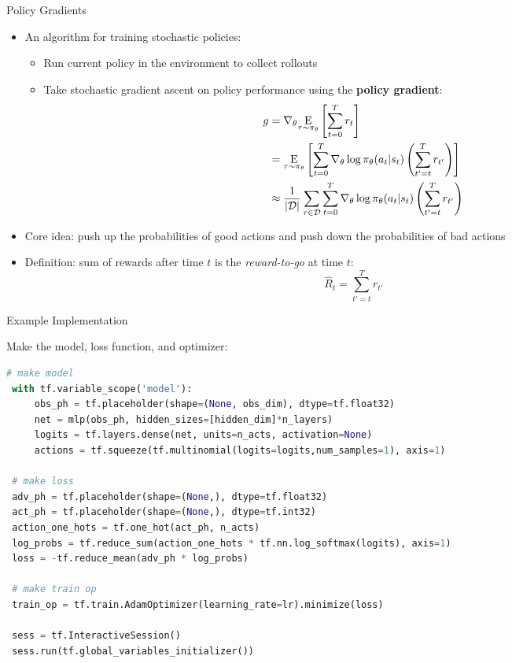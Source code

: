 \documentclass[9pt]{beamer}
\newcommand{\underE}[2]{\underset{\begin{subarray}{c}#1 \end{subarray}}{\E}\left[ #2 \right]}
\begin{document}
\begin{frame}{Policy Gradients}


\begin{itemize}
\item An algorithm for training stochastic policies:
\begin{itemize}
\item Run current policy in the environment to collect rollouts
\item Take stochastic gradient ascent on policy performance using the \textbf{policy gradient}:
\begin{align*}
g &= \nabla_{\theta} \underE{\tau \sim \pi_{\theta}}{\sum_{t=0}^T r_t} \\
&= \underE{\tau \sim \pi_{\theta}}{\sum_{t=0}^T \nabla_{\theta} \log \pi_{\theta}(a_t | s_t) \left(\sum_{t'=t}^T r_{t'}\right)}\\
&\approx \frac{1}{|\calD|}\sum_{\tau \in \calD} \sum_{t=0}^T \nabla_{\theta} \log \pi_{\theta}(a_t | s_t) \left(\sum_{t'=t}^T r_{t'}\right)
\end{align*}
\end{itemize}
\item Core idea: push up the probabilities of good actions and push down the probabilities of bad actions
\item Definition: sum of rewards after time $t$ is the \textit{reward-to-go} at time $t$:
%
\begin{equation*}
\hat{R}_t = \sum_{t'=t}^T r_{t'}
\end{equation*}
\end{itemize}

\end{frame}

\begin{frame}[fragile]{Example Implementation}

\lstset{style=mystyle}
Make the model, loss function, and optimizer:
\begin{lstlisting}[language=python]
 # make model
 with tf.variable_scope('model'):
     obs_ph = tf.placeholder(shape=(None, obs_dim), dtype=tf.float32)
     net = mlp(obs_ph, hidden_sizes=[hidden_dim]*n_layers)
     logits = tf.layers.dense(net, units=n_acts, activation=None)
     actions = tf.squeeze(tf.multinomial(logits=logits,num_samples=1), axis=1)

 # make loss
 adv_ph = tf.placeholder(shape=(None,), dtype=tf.float32)
 act_ph = tf.placeholder(shape=(None,), dtype=tf.int32)
 action_one_hots = tf.one_hot(act_ph, n_acts)
 log_probs = tf.reduce_sum(action_one_hots * tf.nn.log_softmax(logits), axis=1)
 loss = -tf.reduce_mean(adv_ph * log_probs)

 # make train op
 train_op = tf.train.AdamOptimizer(learning_rate=lr).minimize(loss)

 sess = tf.InteractiveSession()
 sess.run(tf.global_variables_initializer())
\end{lstlisting}

\end{frame}
\end{document}
